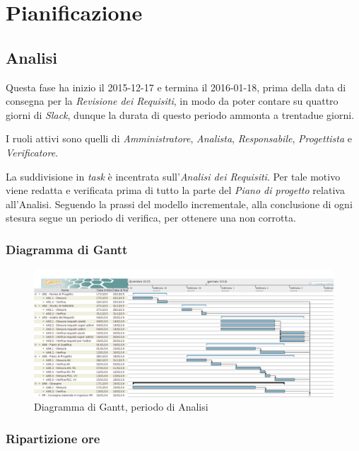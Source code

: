 \section{Pianificazione}
\subsection{Analisi}
Questa fase ha inizio il 2015-12-17 e termina il 2016-01-18, prima della data di consegna per la \textit{Revisione dei Requisiti}, in modo da poter contare su quattro giorni di \textit{Slack}, dunque la durata di questo periodo ammonta a trentadue giorni.

I ruoli attivi sono quelli di \textit{Amministratore}, \textit{Analista}, \textit{Responsabile}, \textit{Progettista} e \textit{Verificatore}.

La suddivisione in \textit{task} \`e incentrata sull'\textit{Analisi dei Requisiti}. Per tale motivo viene redatta e verificata prima di tutto la parte del \textit{Piano di progetto} relativa all'Analisi. Seguendo la prassi del modello incrementale, alla conclusione di ogni stesura segue un periodo di verifica, per ottenere una  non corrotta.
\subsubsection{Diagramma di Gantt}
\begin{figure}[ht!]
\includegraphics[width=1\textwidth]{res/img/pianificazione/Analisi.png}
\caption{Diagramma di Gantt, periodo di Analisi}
\end{figure}

\subsubsection{Ripartizione ore}

